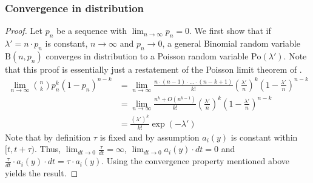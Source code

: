 \subsubsection{Convergence in distribution}
\label{A:convergence_distribution}
\Poisson*
\begin{proof}
Let $p_n$ be a sequence with $\lim_{n \to \infty} p_n = 0$. We first show that if $\lambda'=n \cdot p_n$ is constant, $n \to \infty$ and $p_n \to 0$, a general Binomial random variable $\textrm{B}(n, p_n)$ converges in distribution to a Poisson random variable $\textrm{Po}(\lambda')$. Note that this proof is essentially just a restatement of the Poisson limit theorem of \cite{Poisson.1835}.
\begin{align*}
\lim_{n \to \infty} \binom{n}{k} p^k_n (1-p_n)^{n-k} &= \lim_{n \to \infty} \frac{n \cdot (n-1) \cdot \hdots \cdot (n-k+1)}{k!} \left(\frac{\lambda'}{n} \right)^k \left(1-\frac{\lambda'}{n} \right)^{n-k} \\
&= \lim_{n \to \infty} \frac{n^k + O(n^{k-1})}{k!} \left(\frac{\lambda'}{n} \right)^k \left(1-\frac{\lambda'}{n} \right)^{n-k} \\
&= \frac{\left(\lambda'\right)^k}{k!} \exp{(-\lambda')}
\end{align*}
Note that by definition $\tau$ is fixed and by assumption $a_i(y)$ is constant within $[t, t+\tau)$. Thus, $\lim_{dt \to 0} \frac{\tau}{dt} = \infty$, $\lim_{dt \to 0} a_i(y) \cdot dt = 0$ and $\frac{\tau}{dt} \cdot a_i(y) \cdot dt = \tau \cdot a_i(y)$. Using the convergence property mentioned above yields the result.
\end{proof}


